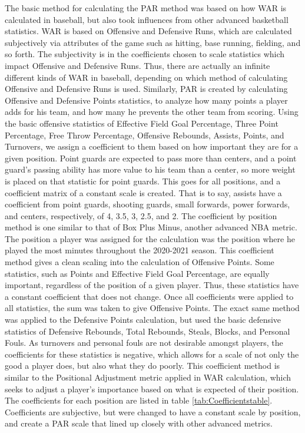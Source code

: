 \documentclass[12pt]{article}
\begin{document}
The basic method for calculating the PAR method was based on how 
WAR is calculated in baseball, but 
also took influences from other advanced basketball statistics. WAR is 
based on Offensive and Defensive 
Runs, which are calculated subjectively via attributes of the game such as 
hitting, base running, fielding, 
and so forth. The subjectivity is in the coefficients chosen to scale 
statistics which impact Offensive and 
Defensive Runs. Thus, there are actually an infinite different kinds of WAR 
in baseball, depending on which 
method of calculating Offensive and Defensive Runs is used. Similarly, 
PAR is created by calculating 
Offensive and Defensive Points statistics, to analyze how many points a 
player adds for his team, and how 
many he prevents the other team from scoring. Using the basic offensive 
statistics of Effective Field Goal 
Percentage, Three Point Percentage, Free Throw Percentage, Offensive 
Rebounds, Assists, Points, and 
Turnovers, we assign a coefficient to them based on how important they 
are for a given position. Point 
guards are expected to pass more than centers, and a point guard's 
passing ability has more value to his 
team than a center, so more weight is placed on that statistic for point 
guards. This goes for all positions, 
and a coefficient matrix of a constant scale is created. That is to say, 
assists have a coefficient from point 
guards, shooting guards, small forwards, power forwards, and centers, 
respectively, of 4, 3.5, 3, 2.5, and 2. 
The coefficient by position method is one similar to that of Box Plus 
Minus, another advanced NBA metric. 
The position a player was assigned for the calculation was the position 
where he played the most minutes 
throughout the 2020-2021 season. This coefficient method gives a clean 
scaling into the calculation of 
Offensive Points. Some statistics, such as Points and Effective Field Goal 
Percentage, are equally 
important, regardless of the position of a given player. Thus, these 
statistics have a constant coefficient that 
does not change. Once all coefficients were applied to all statistics, the 
sum was taken to give Offensive 
Points. The exact same method was applied to the Defensive Points 
calculation, but used the basic 
defensive statistics of Defensive Rebounds, Total Rebounds, Steals, 
Blocks, and Personal Fouls. As 
turnovers and personal fouls are not desirable amongst players, the 
coefficients for these statistics is 
negative, which allows for a scale of not only the good a player does, but 
also what they do poorly. This 
coefficient method is similar to the Positional Adjustment metric applied in 
WAR calculation, which seeks to 
adjust a player's importance based on what is expected of their position. 
The coefficients for each position are listed in table 
\ref{tab:Coefficientstable}. Coefficients are subjective, but were changed 
to have a constant scale by position, and create a PAR scale that lined up 
closely with other advanced metrics.
\end{document}
